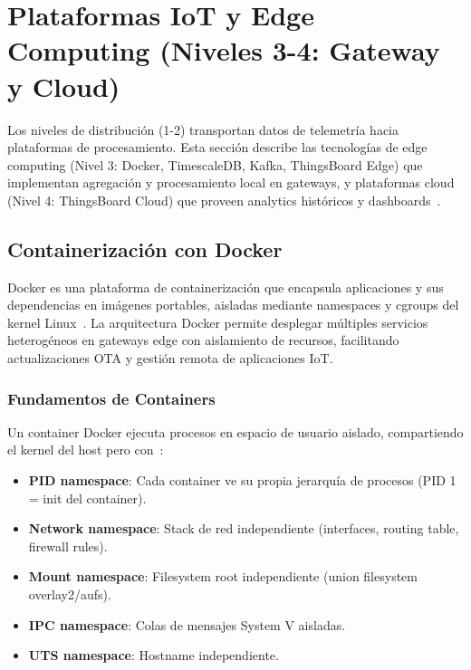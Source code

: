 \section{Plataformas IoT y Edge Computing (Niveles 3-4: Gateway y Cloud)}

Los niveles de distribución (1-2) transportan datos de telemetría hacia plataformas de procesamiento. Esta sección describe las tecnologías de edge computing (Nivel 3: Docker, TimescaleDB, Kafka, ThingsBoard Edge) que implementan agregación y procesamiento local en gateways, y plataformas cloud (Nivel 4: ThingsBoard Cloud) que proveen analytics históricos y dashboards~\cite{liangReviewEdgeComputing2024}.

\subsection{Containerización con Docker}

Docker es una plataforma de containerización que encapsula aplicaciones y sus dependencias en imágenes portables, aisladas mediante namespaces y cgroups del kernel Linux~\cite{liangReviewEdgeComputing2024,boonmeerukCostEffectiveIIoTGateway2024}. La arquitectura Docker permite desplegar múltiples servicios heterogéneos en gateways edge con aislamiento de recursos, facilitando actualizaciones OTA y gestión remota de aplicaciones IoT.

\subsubsection{Fundamentos de Containers}

Un container Docker ejecuta procesos en espacio de usuario aislado, compartiendo el kernel del host pero con~\cite{madsenCosteffectiveEdgeComputing2024}:

\begin{itemize}
\item \textbf{PID namespace}: Cada container ve su propia jerarquía de procesos (PID 1 = init del container).
\item \textbf{Network namespace}: Stack de red independiente (interfaces, routing table, firewall rules).
\item \textbf{Mount namespace}: Filesystem root independiente (union filesystem overlay2/aufs).
\item \textbf{IPC namespace}: Colas de mensajes System V aisladas.
\item \textbf{UTS namespace}: Hostname independiente.
\end{itemize}

